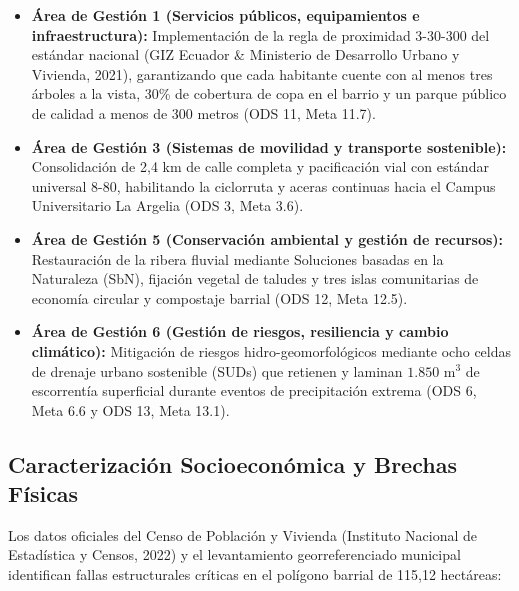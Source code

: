 \documentclass[
  spanish,
  letterpaper,
  DIV=11,
  numbers=noendperiod]{scrartcl}
\providecommand{\tightlist}{%
  \setlength{\itemsep}{0pt}\setlength{\parskip}{0pt}}
\begin{document}
\begin{enumerate}
  \begin{itemize}
  \tightlist
  \item
    \textbf{Área de Gestión 1 (Servicios públicos, equipamientos e
    infraestructura):} Implementación de la regla de proximidad 3-30-300
    del estándar nacional (GIZ Ecuador \& Ministerio de Desarrollo
    Urbano y Vivienda, 2021), garantizando que cada habitante cuente con
    al menos tres árboles a la vista, 30\% de cobertura de copa en el
    barrio y un parque público de calidad a menos de 300 metros (ODS 11,
    Meta 11.7).
  \item
    \textbf{Área de Gestión 3 (Sistemas de movilidad y transporte
    sostenible):} Consolidación de 2,4 km de calle completa y
    pacificación vial con estándar universal 8-80, habilitando la
    ciclorruta y aceras continuas hacia el Campus Universitario La
    Argelia (ODS 3, Meta 3.6).
  \item
    \textbf{Área de Gestión 5 (Conservación ambiental y gestión de
    recursos):} Restauración de la ribera fluvial mediante Soluciones
    basadas en la Naturaleza (SbN), fijación vegetal de taludes y tres
    islas comunitarias de economía circular y compostaje barrial (ODS
    12, Meta 12.5).
  \item
    \textbf{Área de Gestión 6 (Gestión de riesgos, resiliencia y cambio
    climático):} Mitigación de riesgos hidro-geomorfológicos mediante
    ocho celdas de drenaje urbano sostenible (SUDs) que retienen y
    laminan \(1.850 \text{ m}^3\) de escorrentía superficial durante
    eventos de precipitación extrema (ODS 6, Meta 6.6 y ODS 13, Meta
    13.1).
  \end{itemize}
\end{enumerate}

\subsection{Caracterización Socioeconómica y Brechas
Físicas}\label{caracterizaciuxf3n-socioeconuxf3mica-y-brechas-fuxedsicas}

Los datos oficiales del Censo de Población y Vivienda (Instituto
Nacional de Estadística y Censos, 2022) y el levantamiento
georreferenciado municipal identifican fallas estructurales críticas en
el polígono barrial de 115,12 hectáreas:
\end{document}
